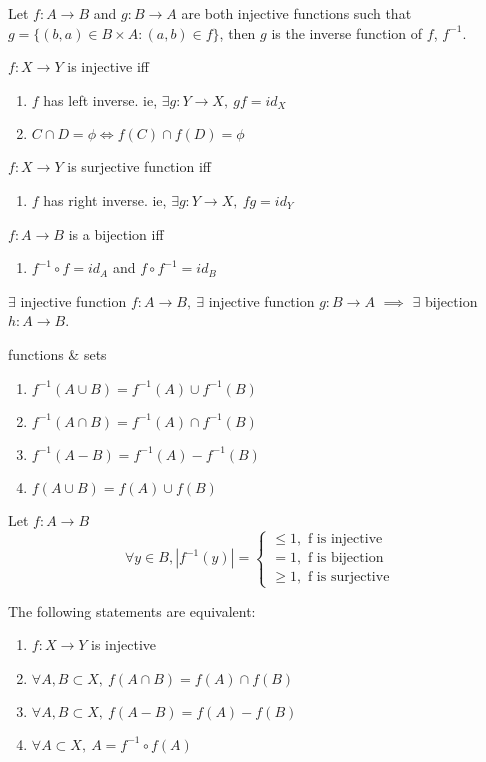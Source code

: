 	\begin{definition}
		Let $f : A \to B$ and $g : B \to A$ are both injective functions such that $g = \{ (b,a) \in B \times A : (a,b) \in f \}$, then $g$ is the inverse function of $f$, $f^{-1}$.
	\end{definition}
	\begin{remark}
		$f : X \to Y$ is injective iff
		\begin{enumerate}
			\item $f$ has left inverse. ie, $\exists g:Y\to X,\ gf = id_X$
			\item $C \cap D = \phi \iff f(C) \cap f(D) = \phi$
		\end{enumerate}
		$f : X \to Y$ is surjective function iff
		\begin{enumerate}
			\item $f$ has right inverse. ie, $\exists g:Y\to X,\ fg = id_Y$
		\end{enumerate}
		$f:A \to B$ is a bijection iff 
		\begin{enumerate}
			\item $f^{-1}\circ f = id_A$ and $f\circ f^{-1} = id_B$
		\end{enumerate}
	\end{remark}
	\begin{theorem}
		$\exists$ injective function $f:A \to B,\ \exists$ injective function $g:B \to A$ $\implies$ $\exists$ bijection $h:A \to B$.
	\end{theorem}
	\begin{remark} functions \& sets
		\begin{enumerate}
		 \item $f^{-1}(A\cup B) = f^{-1}(A) \cup f^{-1}(B)$
		 \item $f^{-1}(A\cap B) = f^{-1}(A) \cap f^{-1}(B)$
		 \item $f^{-1}(A-B) = f^{-1}(A)-f^{-1}(B)$
		 \item $f(A\cup B) = f(A) \cup f(B)$
		\end{enumerate}
	\end{remark}
	\begin{remark} Let $f:A\to B$
		$$\forall y \in B, |f^{-1}(y)| = \begin{cases}
			\leq 1, \text{ f is injective }\\
			= 1, \text{ f is bijection }\\
			\geq 1, \text{ f is surjective}
		\end{cases}$$
	\end{remark}
	\begin{remark}The following statements are equivalent:
		\begin{enumerate}
			\item $f : X \to Y$ is injective
		 	\item $\forall A,B \subset X,\ f(A\cap B) = f(A) \cap f(B)$ 
		 	\item $\forall A,B \subset X,\ f(A-B) = f(A)-f(B)$
		 	\item $\forall A \subset X,\ A = f^{-1}\circ f(A)$
		\end{enumerate}
	\end{remark}
